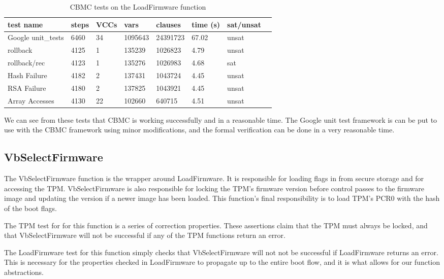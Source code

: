 \documentclass[../report.tex]{subfiles}
\begin{document}
\begin{table}[]
    \centering
    \caption{CBMC tests on the LoadFirmware function}\label{ldfw_results}
    \begin{tabular}{|l|l|l|l|l|l|l|l|}
        \hline
        test name & steps & VCCs & vars  & clauses & time (s) & sat/unsat  \\ \hline \hline
        Google unit\_tests & 6460 & 34 & 1095643 & 24391723 & 67.02 & unsat \\ \hline
        rollback     & 4125 & 1 & 135239 & 1026823 & 4.79 & unsat \\ \hline
        rollback/rec & 4123 & 1 & 135276 & 1026983 & 4.68 & sat \\ \hline
        Hash Failure & 4182 & 2 & 137431 & 1043724 & 4.45 & unsat \\ \hline
        RSA  Failure & 4180 & 2 & 137825 & 1043921 & 4.45 & unsat \\ \hline
        Array Accesses & 4130 & 22 & 102660 & 640715 & 4.51 & unsat \\ \hline
    \end{tabular}
\end{table}

We can see from these tests that CBMC is working successfully and in a reasonable time.
The Google unit test framework is can be put to use with the CBMC framework using minor modifications, and the formal verification can be done in a very reasonable time.

\subsection{VbSelectFirmware}

The VbSelectFirmware function is the wrapper around LoadFirmware.
It is responsible for loading flags in from secure storage and for accessing the TPM\@.
VbSelectFirmware is also responsible for locking the TPM's firmware version before control passes to the firmware image and updating the version if a newer image has been loaded.
This function's final responsibility is to load TPM's PCR0 with the hash of the boot flags.

The TPM test for for this function is a series of correction properties. 
These assertions claim that the TPM must always be locked, and that VbSelectFirmware will not be successful if any of the TPM functions return an error.

The LoadFirmware test for this function simply checks that VbSelectFirmware will not not be successful if LoadFirmware returns an error.
This is necessary for the properties checked in LoadFirmware to propagate up to the entire boot flow, and it is what allows for our function abstractions.
\end{document}
